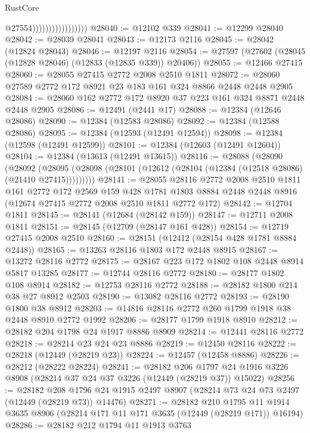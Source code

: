 \begin{lexlean}{RustCore}
\begin{coremodule}
                                      @27554)))))))))))))))))
@28040 := @12102 @339
@28041 := @12299 @28040
@28042 := @28039 @28041
@28043 := @12173 @2116
@28045 := @28042 (@12824 @28043)
@28046 := @12197 @2116
@28054 := @27597 (@27602 (@28045 (@12828 @28046) (@12833 (@12835 @339)) @20406))
@28055 := @12466 @27415
@28060 := @28055 @27415 @2772 @2008 @2510 @1811
@28072 := @28060 @27589 @2772 @172 @8921 @23 @183 @161 @324 @8866 @2448 @2448 @2905
@28084 := @28060 @162 @2772 @172 @8920 @37 @223 @161 @324 @8871 @2448 @2448 @2905
@28086 := @12491 (@2441 @17)
@28088 := @12384 (@12646 @28086)
@28090 := @12384 (@12583 @28086)
@28092 := @12384 (@12588 @28086)
@28095 := @12384 (@12593 (@12491 @12594))
@28098 := @12384 (@12598 (@12491 @12599))
@28101 := @12384 (@12603 (@12491 @12604))
@28104 := @12384 (@13613 (@12491 @13615))
@28116 := @28088
    (@28090
      (@28092
        (@28095 (@28098 (@28101 (@12612 (@28104 (@12384 (@12518 @28086) (@21410 @27415)))))))))
@28141 := @28055
    @28116
    @2772
    @2008
    @2510
    @1811
    @161
    @2772
    @172
    @2569
    @159
    @428
    @1781
    @1803
    @8884
    @2448
    @2448
    @8916
    (@12674 @27415 @2772 @2008 @2510 @1811 @2772 @172)
@28142 := @12704 @1811
@28145 := @28141 (@12684 (@28142 @159))
@28147 := @12711 @2008 @1811
@28151 := @28145 (@12709 (@28147 @161 @428))
@28154 := @12719 @27415 @2008 @2510
@28160 := @28151 (@12412 (@28154 @428 @1781 @8884 @2448))
@28165 := @13263 @28116 @1803 @172 @2448 @8915
@28167 := @13272 @28116 @2772
@28175 := @28167 @223 @172 @1802 @108 @2448 @8914 @5817 @13285
@28177 := @12744 @28116 @2772
@28180 := @28177 @1802 @108 @8914
@28182 := @12753 @28116 @2772
@28188 := @28182 @1800 @214 @38 @27 @8912 @2503
@28190 := @13082 @28116 @2772
@28193 := @28190 @1800 @38 @8912
@28203 := @14816 @28116 @2772 @260 @1799 @1918 @38 @2448 @8910 @2772 @1992
@28206 := @28177 @1799 @1918 @8910
@28212 := @28182 @204 @1798 @24 @1917 @8886 @8909
@28214 := @12441 @28116 @2772
@28218 := @28214 @23 @24 @23 @8886
@28219 := @12450 @28116
@28222 := @28218 (@12449 (@28219 @23))
@28224 := @12457 (@12458 @8886)
@28226 := @28212 (@28222 @28224)
@28241 := @28182
    @206
    @1797
    @24
    @1916
    @3226
    @8908
    (@28214 @37 @24 @37 @3226 (@12449 (@28219 @37)) @15022)
@28256 := @28182
    @208
    @1796
    @24
    @1915
    @2497
    @8907
    (@28214 @73 @24 @73 @2497 (@12449 (@28219 @73)) @14476)
@28271 := @28182
    @210
    @1795
    @11
    @1914
    @3635
    @8906
    (@28214 @171 @11 @171 @3635 (@12449 (@28219 @171)) @16194)
@28286 := @28182
    @212
    @1794
    @11
    @1913
    @3763

\end{coremodule}
\end{lexlean}
